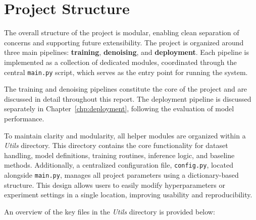\chapter{Project Structure}
\label{appendix:project_structure}

The overall structure of the project is modular, enabling clean separation of concerns and supporting future extensibility. The project is organized around three main pipelines: \textbf{training}, \textbf{denoising}, and \textbf{deployment}. Each pipeline is implemented as a collection of dedicated modules, coordinated through the central \texttt{main.py} script, which serves as the entry point for running the system.

The training and denoising pipelines constitute the core of the project and are discussed in detail throughout this report. The deployment pipeline is discussed separately in Chapter~\ref{chp:deployment}, following the evaluation of model performance.

To maintain clarity and modularity, all helper modules are organized within a \textit{Utils} directory. This directory contains the core functionality for dataset handling, model definitions, training routines, inference logic, and baseline methods. Additionally, a centralized configuration file, \texttt{config.py}, located alongside \texttt{main.py}, manages all project parameters using a dictionary-based structure. This design allows users to easily modify hyperparameters or experiment settings in a single location, improving usability and reproducibility.

An overview of the key files in the \textit{Utils} directory is provided below:

